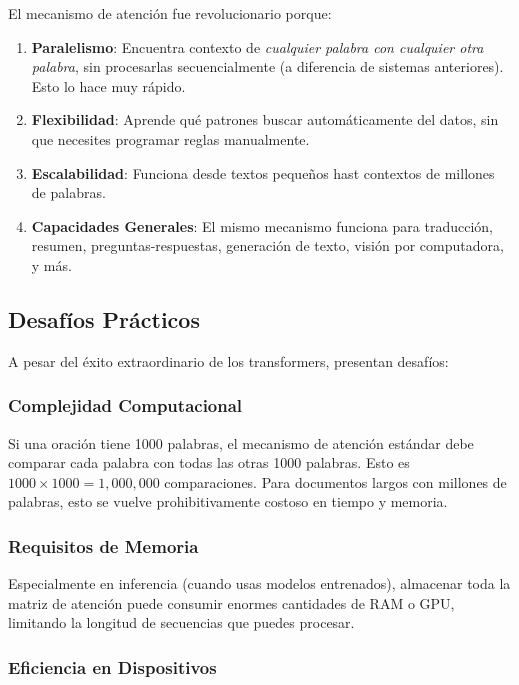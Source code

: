 \documentclass[11pt,a4paper]{article}
\begin{document}
El mecanismo de atención fue revolucionario porque:
\begin{enumerate}[leftmargin=*]
    \item \textbf{Paralelismo}: Encuentra contexto de \emph{cualquier palabra con cualquier otra palabra}, sin procesarlas secuencialmente (a diferencia de sistemas anteriores). Esto lo hace muy rápido.
    \item \textbf{Flexibilidad}: Aprende qué patrones buscar automáticamente del datos, sin que necesites programar reglas manualmente.
    \item \textbf{Escalabilidad}: Funciona desde textos pequeños hast contextos de millones de palabras.
    \item \textbf{Capacidades Generales}: El mismo mecanismo funciona para traducción, resumen, preguntas-respuestas, generación de texto, visión por computadora, y más.
\end{enumerate}

\subsection{Desafíos Prácticos}

A pesar del éxito extraordinario de los transformers, presentan desafíos:

\subsubsection{Complejidad Computacional}

Si una oración tiene 1000 palabras, el mecanismo de atención estándar debe comparar cada palabra con todas las otras 1000 palabras. Esto es $1000 \times 1000 = 1,000,000$ comparaciones. Para documentos largos con millones de palabras, esto se vuelve prohibitivamente costoso en tiempo y memoria.

\subsubsection{Requisitos de Memoria}

Especialmente en inferencia (cuando usas modelos entrenados), almacenar toda la matriz de atención puede consumir enormes cantidades de RAM o GPU, limitando la longitud de secuencias que puedes procesar.

\subsubsection{Eficiencia en Dispositivos}
\end{document}

